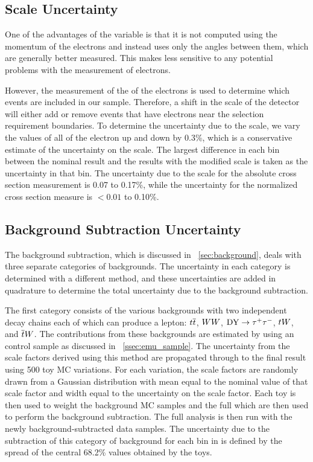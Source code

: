 \subsection{\texorpdfstring{\pt}{PT} Scale Uncertainty}
\label{ssec:pt_scale_uncertainty}

One of the advantages of the \phistar variable is that it is not computed using
the momentum of the electrons and instead uses only the angles between them,
which are generally better measured. This makes \phistar less sensitive to any
potential problems with the \pt measurement of electrons.

However, the measurement of the \pt of the electrons is used to determine which
events are included in our sample. Therefore, a shift in the \pt scale of the
detector will either add or remove events that have electrons near the \pt
selection requirement boundaries. To determine the uncertainty due to the \pt
scale, we vary the \pt values of all of the electron up and down by 0.3\%,
which is a conservative estimate of the uncertainty on the \pt scale. The
largest difference in each \phistar bin between the nominal result and the
results with the modified \pt scale is taken as the uncertainty in that bin.
The uncertainty due to the \pt scale for the absolute cross section measurement
is 0.07 to 0.17\%, while the uncertainty for the normalized cross section
measure is $< 0.01$ to 0.10\%.

\subsection{Background Subtraction Uncertainty}
\label{ssec:background_subtraction_uncertainty}

The background subtraction, which is discussed in \SEC~\ref{sec:background},
deals with three separate categories of backgrounds. The uncertainty in
each category is determined with a different method, and these uncertainties
are added in quadrature to determine the total uncertainty due to the
background subtraction.

The first category consists of the various backgrounds with two independent
decay chains each of which can produce a lepton: $t\overline{t}$, $WW$,
$\text{DY} \to \tau^{+} \tau^{-}$, $tW$, and $\overline{t}W$. The contributions from these backgrounds
are estimated by using an \emu control sample as discussed in
\SEC~\ref{ssec:emu_sample}. The uncertainty from the scale factors derived
using this method are propagated through to the final result using 500 toy MC
variations. For each variation, the scale factors are randomly drawn from a
Gaussian distribution with mean equal to the nominal value of that scale factor
and width equal to the uncertainty on the scale factor. Each toy is then used
to weight the background MC samples and the full which are then used to perform
the background subtraction. The full analysis is then run with the newly
background-subtracted data samples. The uncertainty due to the subtraction of
this category of background for each bin in \phistar is defined by the spread
of the central 68.2\% values obtained by the toys.

